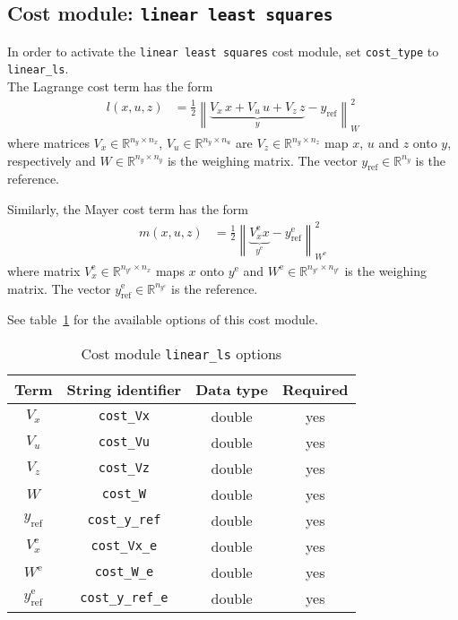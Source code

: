 \documentclass[english]{article}
\newcommand{\code}[1]{\texttt{#1}}
\newcommand{\norm}[1]{\left\lVert#1\right\rVert}
\newcommand{\ind}[1]{_{\textrm{#1}}}
\newcommand{\terminal}{^{\textrm{e}}}
\newcommand{\mandatory}{yes}
\begin{document}
\subsection{Cost module: \code{linear least squares}}\label{sec:cost:linear_ls}
%
In order to activate the \code{linear least squares} cost module, set \code{cost\_type} to \code{linear\_ls}.\\
The Lagrange cost term has the form
\begin{align}
l(x, u, z) &= \frac{1}{2} \norm{ \underbrace{V_x\, x + V_u\, u + V_z\, z}_{\displaystyle y} - y\ind{ref}}_W^2 \label{eq:cost:linear_ls:l}
\end{align}
where matrices $ V_x \in \mathbb{R}^{n_y \times n_x}$, $V_u \in \mathbb{R}^{n_y \times n_u}$ are $V_z \in \mathbb{R}^{n_y \times n_z}$ map $x$, $u$ and $z$ onto $y$, respectively and $W \in \mathbb{R}^{n_y \times n_y}$ is the weighing matrix. The vector $y\ind{ref} \in \mathbb{R}^{n_y}$ is the reference.

Similarly, the Mayer cost term has the form
\begin{align}
m(x, u, z) &= \frac{1}{2} \norm{ \underbrace{V_x\terminal x}_{\displaystyle y\terminal} - y\ind{ref}\terminal}_{W\terminal}^2 \label{eq:cost:linear_ls:m}
\end{align}
where matrix $ V\terminal_x \in \mathbb{R}^{n_{y\terminal} \times n_x}$ maps $x$ onto $y\terminal$ and $W\terminal \in \mathbb{R}^{n_{y\terminal} \times n_{y\terminal}}$ is the weighing matrix. The vector $y\terminal_\textrm{ref} \in \mathbb{R}^{n_{y\terminal}}$ is the reference.

See table~\ref{tab:cost:linear_ls} for the available options of this cost module.
%
\begin{table}[h!]
    \centering
    \caption{Cost module \code{linear\_ls} options} \label{tab:cost:linear_ls}
    \begin{tabular}{cccc}
        \toprule
        Term & String identifier & Data type & Required \\ \midrule
        $ V_x $ & \code{cost\_Vx}    & double & \mandatory   \\
        $ V_u $ & \code{cost\_Vu}    & double & \mandatory   \\
        $ V_z $ & \code{cost\_Vz}    & double & \mandatory  \\
        $ W $ & \code{cost\_W}    & double & \mandatory  \\
        $ y\ind{ref} $ & \code{cost\_y\_ref}    & double & \mandatory   \\ [1em]
        $ V_x\terminal $ & \code{cost\_Vx\_e}    & double  & \mandatory  \\
        $ W\terminal $ & \code{cost\_W\_e}    & double & \mandatory   \\
        $ y\ind{ref}\terminal $ & \code{cost\_y\_ref\_e}   & double & \mandatory   \\
        \bottomrule
    \end{tabular}
\end{table}
%
\end{document}
